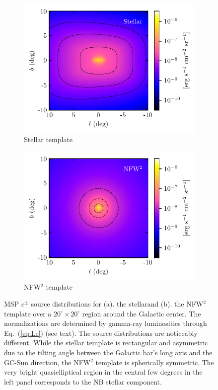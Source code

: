 \documentclass[doublespace,nopageskip]{VTthesis}
\begin{document}
\begin{figure}[htb]
	\centering
	\begin{subfigure}[h]{0.45\textwidth}
		\centering
		\includegraphics[width=\textwidth]{Figures/IC_MSPs/injection_skymap_bulge.pdf}
		\caption{Stellar template}
		\label{fig:injection_skymap_bulge}
	\end{subfigure}
	\begin{subfigure}[h]{0.45\textwidth}
		\centering
		\includegraphics[width=\textwidth]{Figures/IC_MSPs/injection_skymap_nfw.pdf}
		\caption{NFW$^2$ template}
		\label{fig:njection_skymap_nfw}
	\end{subfigure}
	\caption{MSP $e^\pm$ source distributions for (a).  the stellarand (b). the NFW$^2$ template over a $20^\circ \times 20^\circ$ region around the Galactic center. The normalizations are determined by gamma-ray luminosities through Eq.~(\ref{eq:Le}) (see text). The source distributions are noticeably different. While the stellar template is rectangular and asymmetric due to the tilting angle between the Galactic bar's long axis and the GC-Sun direction, the NFW$^2$ template is spherically symmetric. The very bright quasielliptical region in the central few degrees in the left panel corresponds to the NB stellar component.}
	\label{fig:injection_skymap}
\end{figure}
\end{document}
